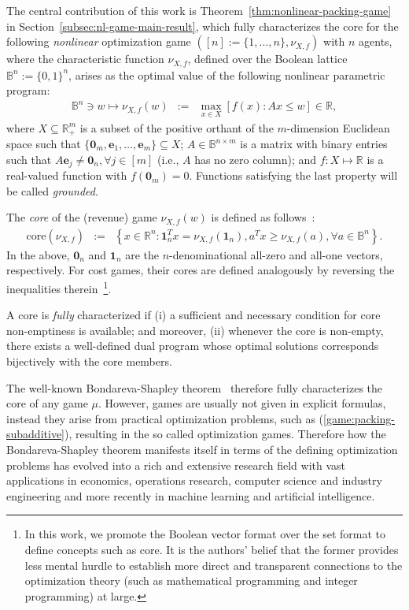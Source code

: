 \documentclass[11pt]{article}\usepackage[]{graphicx}\usepackage[]{xcolor}
\begin{document}
The central contribution of this work is Theorem~\ref{thm:nonlinear-packing-game} in Section~\ref{subsec:nl-game-main-result}, which fully characterizes the core for the following \emph{nonlinear} optimization game $\left([n]:=\{1,\dots, n\}, \nu_{X, f}\right)$ with $n$ agents, where the characteristic function $\nu_{X, f}$, defined over the Boolean lattice $\mathbb{B}^n:=\{0,1\}^n$, arises as the optimal value of the following nonlinear parametric program:
\begin{eqnarray}
\label{game:packing-subadditive}\mathbb{B}^n\ni w\mapsto \nu_{X, f}(w)&:=&\max\limits_{x\in X} \left[f(x): Ax\le w\right]\in  \mathbb{R},
\end{eqnarray}
where $X\subseteq \mathbb{R}^m_{+}$ is a subset of the positive orthant of the $m$-dimension Euclidean space such that $\{\mathbf{0}_m, \mathbf{e}_1,\dots, \mathbf{e}_m\}\subseteq X$; $A\in \mathbb{B}^{n\times m}$ is a matrix with binary entries such that $A\mathbf{e}_j\ne \mathbf{0}_n, \forall j\in [m]$ (i.e., $A$ has no zero column); and $f: X\mapsto \mathbb{R}$ is a real-valued function with $f\left(\mathbf{0}_m\right)=0$. Functions satisfying the last property will be called \emph{grounded}.


The \emph{core} of the (revenue) game $\nu_{X, f}(w)$ is defined as follows~\citep{gillies1953some,shapley1967balanced}: 
\begin{eqnarray*}
\text{core}\left(\nu_{X, f}\right)&:=&\left\{x\in \mathbb{R}^n: \mathbf{1}_n^Tx=\nu_{X, f}\left(\mathbf{1}_n\right), a^Tx\ge \nu_{X, f}(a), \forall a\in \mathbb{B}^n\right\}. 
\end{eqnarray*}
In the above,  $\mathbf{0}_n$ and $\mathbf{1}_n$ are the $n$-denominational all-zero and all-one vectors, respectively. For cost games, their cores are defined analogously by reversing the inequalities therein~\footnote{In this work, we promote the Boolean vector format over the set format to define concepts such as core. It is the authors' belief that the former provides less mental hurdle to establish more direct and transparent connections to the optimization theory (such as mathematical programming and integer programming) at large.}. 

A core is \emph{fully} characterized if (i) a sufficient and necessary condition for core non-emptiness is available; and moreover, (ii) whenever the core is non-empty, there exists a well-defined dual program whose optimal solutions corresponds bijectively with the core members.   

The well-known Bondareva-Shapley theorem~\citep{bondareva1963some,shapley1967balanced} therefore fully characterizes the core of any game $\mu$. However, games are usually not given in explicit formulas, instead they arise from practical optimization problems, such as (\ref{game:packing-subadditive}), resulting in the so called optimization games. Therefore how the Bondareva-Shapley theorem manifests itself in terms of the defining optimization problems has evolved into a rich and extensive research field with vast applications in economics, operations research, computer science and industry engineering and more recently in machine learning and artificial intelligence. 
\end{document}
